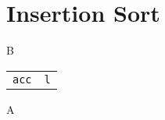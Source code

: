 \documentclass[]{book}
\newcommand{\of}{\lstinline[language=caml,mathescape,basicstyle=\ttfamily]}
\begin{document}
\section{Insertion Sort}

B
  \begin{tabular}{cc}
    \of{acc}
    &
    \of{l}
  \end{tabular}
A
\end{document}
